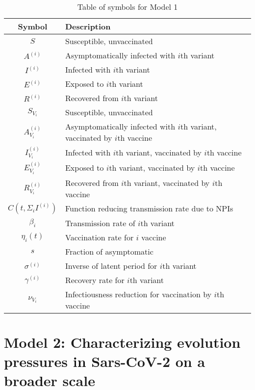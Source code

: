 \documentclass{article}
\begin{document}
\begin{table}[h!]
    \begin{center}
    \begin{tabular}{c|l}
            Symbol & Description \\
            \hline
            \hline
            $S$ & Susceptible, unvaccinated \\
            $A^{(i)}$ & Asymptomatically infected with $i$th variant\\
            $I^{(i)}$ & Infected with $i$th variant \\
            $E^{(i)}$ & Exposed to $i$th variant \\
            $R^{(i)}$ & Recovered from $i$th variant \\
            $S_{V_i}$ & Susceptible, unvaccinated \\
            $A^{(i)}_{V_i}$ & Asymptomatically infected with $i$th variant, vaccinated by $i$th vaccine\\
            $I^{(i)}_{V_i}$ & Infected with $i$th variant, vaccinated by $i$th vaccine\\
            $E^{(i)}_{V_i}$ & Exposed to $i$th variant, vaccinated by $i$th vaccine\\
            $R^{(i)}_{V_i}$ & Recovered from $i$th variant, vaccinated by $i$th vaccine\\
            $C(t, \Sigma_i I^{(i)}) $ & Function reducing transmission rate due to NPIs \\
            $\beta_i$ & Transmission rate of $i$th variant \\
            $\eta_i(t)$ & Vaccination rate for $i$ vaccine\\
            $s$ & Fraction of asymptomatic \\
            $\sigma^{(i)}$ & Inverse of latent period for $i$th variant \\
            $\gamma^{(i)}$ & Recovery rate for $i$th variant \\
            $\nu_{V_i}$ & Infectiousness reduction for vaccination by $i$th vaccine \\
    \end{tabular}
    \caption{Table of symbols for Model 1}

    \label{variables}
    \end{center}
\end{table}

\section{Model 2: Characterizing evolution pressures in Sars-CoV-2 on a broader scale}
\end{document}
